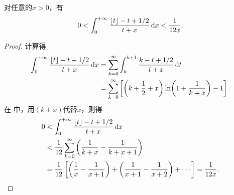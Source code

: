 \begin{lemma}\label{theorem:定积分.伽马函数的斯特灵近似.引理2}
对任意的\(x>0\)，有\begin{equation}\label{equation:定积分.伽马函数的斯特灵近似.引理2}
0 < \int_0^{+\infty} \frac{\lfloor t\rfloor - t + 1/2}{t + x} \dd{x} < \frac{1}{12 x}.
\end{equation}
\begin{proof}
计算得\begin{align*}
\int_0^{+\infty} \frac{\lfloor t\rfloor - t + 1/2}{t + x} \dd{x}
&= \sum\limits_{k=0}^\infty \int_k^{k+1} \frac{k - t + 1/2}{t + x} \dd{t} \\
&= \sum\limits_{k=0}^\infty \left[
\left(k + \frac{1}{2} + x\right) \ln(1 + \frac{1}{k + x}) - 1
\right].
\end{align*}
在  中，用\((k+x)\)代替\(x\)，则得\begin{align*}
0 &< \int_0^{+\infty} \frac{\lfloor t\rfloor - t + 1/2}{t + x} \dd{x} \\
&< \frac{1}{12} \sum\limits_{k=0}^\infty \left(\frac{1}{k+x} - \frac{1}{k+x+1}\right) \\
&= \frac{1}{12} \left[
\left(\frac{1}{x} - \frac{1}{x+1}\right) + \left(\frac{1}{x+1} - \frac{1}{x+2}\right) + \dotsb
\right]
= \frac{1}{12x}.
\qedhere
\end{align*}
\end{proof}
\end{lemma}

